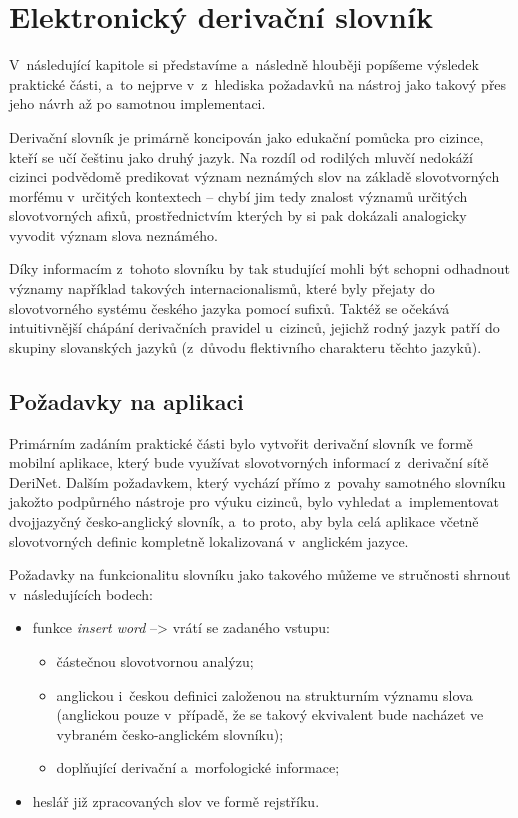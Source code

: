 \hypertarget{elektronickuxfd-derivaux10dnuxed-slovnuxedk}{%
\chapter{Elektronický derivační
slovník}\label{elektronickuxfd-derivaux10dnuxed-slovnuxedk}}

V~následující kapitole si představíme a~následně hlouběji popíšeme
výsledek praktické části, a~to nejprve v~z~hlediska požadavků na nástroj
jako takový přes jeho návrh až po samotnou implementaci.

Derivační slovník je primárně koncipován jako edukační pomůcka pro
cizince, kteří se učí češtinu jako druhý jazyk. Na rozdíl od rodilých
mluvčí nedokáží cizinci podvědomě predikovat význam neznámých slov na
základě slovotvorných morfému v~určitých kontextech -- chybí jim tedy
znalost významů určitých slovotvorných afixů, prostřednictvím kterých by
si pak dokázali analogicky vyvodit význam slova neznámého.

Díky informacím z~tohoto slovníku by tak studující mohli být schopni
odhadnout významy například takových internacionalismů, které byly
přejaty do slovotvorného systému českého jazyka pomocí sufixů. Taktéž se
očekává intuitivnější chápání derivačních pravidel u~cizinců, jejichž
rodný jazyk patří do skupiny slovanských jazyků (z~důvodu flektivního
charakteru těchto jazyků).~\parencite{adri}

\hypertarget{poux17eadavky-na-aplikaci}{%
\section{Požadavky na aplikaci}\label{poux17eadavky-na-aplikaci}}

Primárním zadáním praktické části bylo vytvořit derivační slovník ve
formě mobilní aplikace, který bude využívat slovotvorných informací
z~derivační sítě DeriNet. Dalším požadavkem, který vychází přímo z~povahy
samotného slovníku jakožto podpůrného nástroje pro výuku cizinců, bylo
vyhledat a~implementovat dvojjazyčný česko-anglický slovník, a~to proto,
aby byla celá aplikace včetně slovotvorných definic kompletně
lokalizovaná v~anglickém jazyce.

Požadavky na funkcionalitu slovníku jako takového můžeme ve stručnosti
shrnout v~následujících bodech:

\begin{itemize}
\tightlist
\item
  funkce \emph{insert word} --\textgreater{} vrátí se zadaného vstupu:

  \begin{itemize}
  \tightlist
  \item
    částečnou slovotvornou analýzu;
  \item
    anglickou i~českou definici založenou na strukturním významu slova
    (anglickou pouze v~případě, že se takový ekvivalent bude nacházet ve
    vybraném česko-anglickém slovníku);
  \item
    doplňující derivační a~morfologické informace;
  \end{itemize}
\item
  heslář již zpracovaných slov ve formě rejstříku.
\end{itemize}

